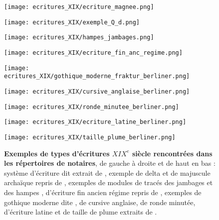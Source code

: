 \begin{figure}[!h]
    \begin{minipage}[c]{.46\linewidth} 
        \centering
        \texttt{[image: ecritures\_XIX/ecriture\_magnee.png]}
    \end{minipage}
    \hfill%
    \begin{minipage}[c]{.46\linewidth}
        \centering
        \texttt{[image: ecritures\_XIX/exemple\_Q\_d.png]}    
    \end{minipage}
\end{figure}
\begin{figure}[!h]
        \centering
        \texttt{[image: ecritures\_XIX/hampes\_jambages.png]}
\end{figure}
\begin{figure}[!h]
    \begin{minipage}[c]{.46\linewidth} 
        \centering
        \texttt{[image: ecritures\_XIX/ecriture\_fin\_anc\_regime.png]}
        \end{minipage}
    \hfill%
    \begin{minipage}[c]{.46\linewidth}
        \centering
        \texttt{[image: ecritures\_XIX/gothique\_moderne\_fraktur\_berliner.png]}
    \end{minipage}
\end{figure}
\begin{figure}[!h]
        \centering
        \texttt{[image: ecritures\_XIX/cursive\_anglaise\_berliner.png]}
\end{figure}
\begin{figure}[h!]
    \centering
    \texttt{[image: ecritures\_XIX/ronde\_minutee\_berliner.png]}    
    \label{fig:my_label}
\end{figure}
\begin{figure}[!h]
        \centering
        \texttt{[image: ecritures\_XIX/ecriture\_latine\_berliner.png]}
\end{figure}
\begin{figure}[!h]
        \centering
        \texttt{[image: ecritures\_XIX/taille\_plume\_berliner.png]}
        \caption{\textbf{Exemples de types d'écritures $ XIX^{e}$ siècle rencontrées dans les répertoires de notaires}, de gauche à droite et de haut en bas : système d'écriture dit  extrait de \cite{magnee_parfait_1828}, exemple de  delta et de  majuscule archaïque repris de \cite{molliard_methode_1861}, exemples de modules de tracés des jambages et des hampes \cite{werdet_innovation_1841}, d'écriture fin ancien régime repris de \cite{fremont_cahiers_1837}, exemples de gothique moderne dite , de cursive anglaise, de ronde minutée, d'écriture latine et de taille de plume extraits de \cite{berliner_cours_1862}.}
    \label{fig:ecritures_XIX}
\end{figure}
